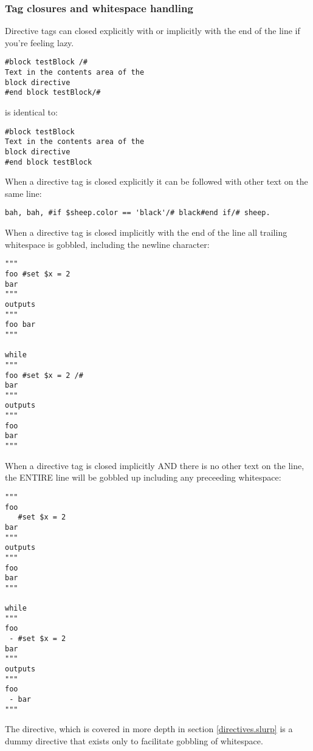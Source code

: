 \subsubsection{Tag closures and whitespace handling}
\label{TDL.directives.closures}
Directive tags can closed explicitly with \code{/\#} or implicitly with the end
of the line if you're feeling lazy.

\begin{verbatim}
#block testBlock /#
Text in the contents area of the
block directive
#end block testBlock/#
\end{verbatim}
is identical to:
\begin{verbatim}
#block testBlock
Text in the contents area of the
block directive
#end block testBlock
\end{verbatim}

When a directive tag is closed explicitly it can be followed with other text on
the same line:

\begin{verbatim}
bah, bah, #if $sheep.color == 'black'/# black#end if/# sheep.
\end{verbatim}

When a directive tag is closed implicitly with the end of the line all trailing
whitespace is gobbled, including the newline character:
\begin{verbatim}
"""
foo #set $x = 2 
bar
"""
outputs 
"""
foo bar
"""

while 
"""
foo #set $x = 2 /#
bar
"""
outputs 
"""
foo 
bar
"""
\end{verbatim}

When a directive tag is closed implicitly AND there is no other text on the
line, the ENTIRE line will be gobbled up including any preceeding whitespace:
\begin{verbatim}
"""
foo 
   #set $x = 2 
bar
"""
outputs 
"""
foo
bar
"""

while 
"""
foo 
 - #set $x = 2
bar
"""
outputs 
"""
foo 
 - bar
"""
\end{verbatim}

The  directive, which is covered in more depth in section
\ref{directives.slurp} is a dummy directive that exists only to facilitate
gobbling of whitespace.


%



